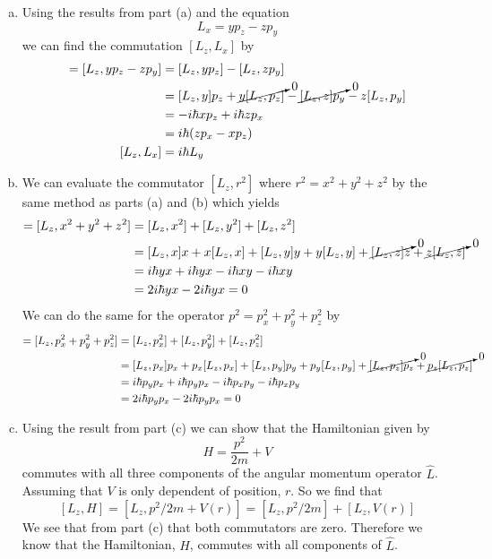 \documentclass[11pt]{article}
\numberwithin{equation}{section}
\begin{document}
\begin{enumerate}[(a)]
\item
Using the results from part (a) and the equation
$$L_x = yp_z - zp_y$$
we can find the commutation $[L_z,L_x]$ by
\begin{align*}
[L_z,L_x] = [L_z,yp_z - zp_y] &= [L_z,yp_z] - [L_z,zp_y]\\
&= [L_z,y]p_z + \cancelto{0}{y[L_z,p_z]} - \cancelto{0}{[L_z,z]p_y} - z[L_z,p_y]\\
&=-i\hbar xp_z + i\hbar zp_x \\
&= i\hbar(zp_x-xp_z) \\
[L_z,L_x] &= i\hbar L_y
\end{align*}

\item
We can evaluate the commutator $[L_z,r^2]$ where $r^2 = x^2+y^2+z^2$ by the same method as parts (a) and (b) which yields
\begin{align*}
[L_z,r^2] = [L_z, x^2+y^2+z^2] &= [L_z,x^2]+[L_z,y^2]+[L_z,z^2]\\
&= [L_z,x]x + x[L_z,x] +[L_z,y]y + y[L_z,y] + \cancelto{0}{[L_z,z]z} + \cancelto{0}{z[L_z,z]}\\
&= i\hbar yx + i\hbar yx - i\hbar xy -i\hbar xy\\
&= 2i\hbar yx - 2i\hbar yx = 0
\end{align*}
We can do the same for the operator $p^2 = p_x^2 +p_y^2 +p_z^2$ by
\begin{align*}
[L_z,p^2] = [L_z, p_x^2+p_y^2+p_z^2] &= [L_z,p_x^2]+[L_z,p_y^2]+[L_z,p_z^2]\\
&= [L_z,p_x]p_x + p_x[L_z,p_x] +[L_z,p_y]p_y + p_y[L_z,p_y] + \cancelto{0}{[L_z,p_z]p_z} + \cancelto{0}{p_z[L_z,p_z]}\\
&= i\hbar p_yp_x + i\hbar p_yp_x - i\hbar p_xp_y -i\hbar p_xp_y\\
&= 2i\hbar p_yp_x - 2i\hbar p_yp_x = 0
\end{align*}

\item
Using the result from part (c) we can show that the Hamiltonian given by
$$H = \frac{p^2}{2m} + V$$
commutes with all three components of the angular momentum operator $\hat{L}$. Assuming that $V$ is only dependent of position, $r$. So we find that
$$[L_z,H] = [L_z, p^2/2m+V(r)] = [L_z,p^2/2m]+[L_z,V(r)]$$
We see that from part (c) that both commutators are zero. Therefore we know that the Hamiltonian, $H$, commutes with all components of $\hat{L}$.
\end{enumerate}
\end{document}
